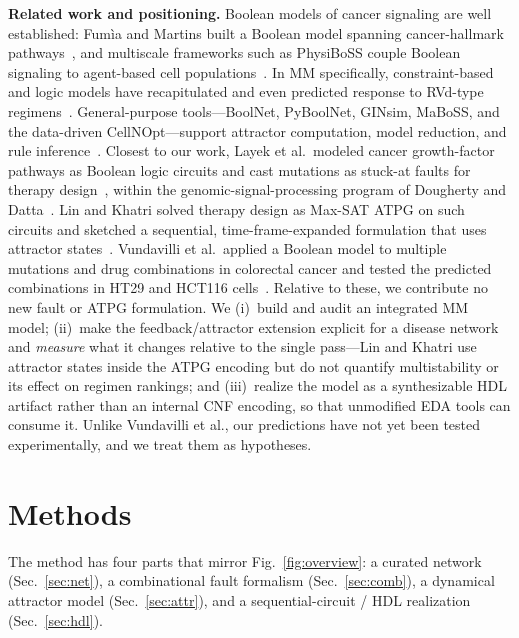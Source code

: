 \documentclass[conference,letterpaper]{IEEEtran}
\begin{document}
\textbf{Related work and positioning.}
Boolean models of cancer signaling are well established: Fum\`ia and Martins
built a Boolean model spanning cancer-hallmark pathways~\cite{fumia}, and
multiscale frameworks such as PhysiBoSS couple Boolean signaling to agent-based
cell populations~\cite{physiboss}. In MM specifically, constraint-based and
logic models have recapitulated and even predicted response to RVd-type
regimens~\cite{cbm}. General-purpose tools---BoolNet, PyBoolNet, GINsim, MaBoSS,
and the data-driven CellNOpt---support attractor computation, model reduction,
and rule inference~\cite{pyboolnet,ginsim,maboss,cellnopt}. Closest to our work, Layek et al.\ modeled cancer growth-factor pathways as
Boolean logic circuits and cast mutations as stuck-at faults for therapy
design~\cite{layek}, within the genomic-signal-processing program of Dougherty
and Datta~\cite{gsp}. Lin and Khatri solved therapy design as Max-SAT ATPG on such
circuits and sketched a sequential, time-frame-expanded formulation that uses
attractor states~\cite{linkhatri}. Vundavilli et al.\ applied a Boolean model to
multiple mutations and drug combinations in colorectal cancer and tested the
predicted combinations in HT29 and HCT116 cells~\cite{vundavilli}. Relative to
these, we contribute no new fault or ATPG formulation. We (i)~build and audit an
integrated MM model; (ii)~make the feedback/attractor extension explicit for a
disease network and \emph{measure} what it changes relative to the single
pass---Lin and Khatri use attractor states inside the ATPG encoding but do not
quantify multistability or its effect on regimen rankings; and (iii)~realize the
model as a synthesizable HDL artifact rather than an internal CNF encoding, so
that unmodified EDA tools can consume it. Unlike Vundavilli et al., our
predictions have not yet been tested experimentally, and we treat them as
hypotheses.

\section{Methods}\label{sec:methods}

The method has four parts that mirror Fig.~\ref{fig:overview}: a curated network
(Sec.~\ref{sec:net}), a combinational fault formalism (Sec.~\ref{sec:comb}), a
dynamical attractor model (Sec.~\ref{sec:attr}), and a sequential-circuit / HDL
realization (Sec.~\ref{sec:hdl}).
\end{document}
